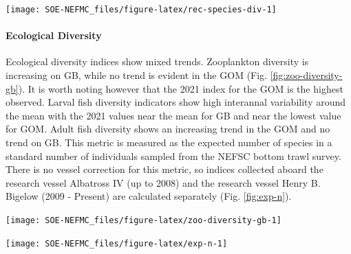 \documentclass[
  10pt,
]{article}
\let\origfigure\figure
\let\endorigfigure\endfigure
\renewenvironment{figure}[1][2] {
    \expandafter\origfigure\expandafter[H]
} {
    \endorigfigure
}
\begin{document}
\begin{figure}

{\centering \texttt{[image: SOE-NEFMC\_files/figure-latex/rec-species-div-1]} 

}

\caption{Diversity of recreational catch in New England.}\label{fig:rec-species-div}
\end{figure}

\hypertarget{ecological-diversity}{%
\paragraph{Ecological Diversity}\label{ecological-diversity}}

Ecological diversity indices show mixed trends. Zooplankton diversity is increasing on GB, while no trend is evident in the GOM (Fig. \ref{fig:zoo-diversity-gb}). It is worth noting however that the 2021 index for the GOM is the highest observed. Larval fish diversity indicators show high interannal variability around the mean with the 2021 values near the mean for GB and near the lowest value for GOM. Adult fish diversity shows an increasing trend in the GOM and no trend on GB. This metric is measured as the expected number of species in a standard number of individuals sampled from the NEFSC bottom trawl survey. There is no vessel correction for this metric, so indices collected aboard the research vessel Albatross IV (up to 2008) and the research vessel Henry B. Bigelow (2009 - Present) are calculated separately (Fig. \ref{fig:exp-n}).

\begin{figure}

{\centering \texttt{[image: SOE-NEFMC\_files/figure-latex/zoo-diversity-gb-1]} 

}

\caption{Zooplankton diversity on Georges Bank and in the Gulf of Maine, based on Shannon diversity index. 2020 surveys were incomplete due to COVID-19.}\label{fig:zoo-diversity-gb}
\end{figure}

\begin{figure}

{\centering \texttt{[image: SOE-NEFMC\_files/figure-latex/exp-n-1]} 

}

\caption{Adult fish diversity for Georges Bank and in the Gulf of Maine, based on expected number of species. Results from survey vessels Albatross and Bigelow are reported separately due to catchability differences.}\label{fig:exp-n}
\end{figure}
\end{document}

